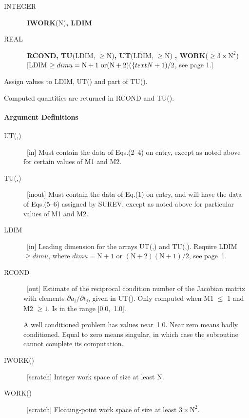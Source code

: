 \documentclass[twoside]{MATH77}
\begin{document}
\begin{description}
\item[INTEGER]  \ {\bf IWORK}(N){\bf , LDIM}

\item[REAL]  \ {\bf RCOND, TU}(LDIM, $\geq $N){\bf , UT}(LDIM, $\geq $N){\bf %
, WORK}($\geq 3\times \text{N}^2$) \ [LDIM $\geq dimu = \text{N}+1 \text{ or}\\
(\text{N}+2)(\{text{N}+1)/2$, see page 1.]
\end{description}

Assign values to LDIM, UT() and part of TU().

\begin{center}
\end{center}

Computed quantities are returned in RCOND and TU().

\paragraph{Argument Definitions}

\begin{description}
\item[UT(,)]  \ [in] Must contain the data of Eqs.(2--4) on entry, except as
noted above for certain values of M1 and M2.

\item[TU(,)]  \ [inout] Must contain the data of Eq.(1) on entry, and will
have the data of Eqs.(5--6) assigned by SUREV, except as noted above for
particular values of M1 and M2.

\item[LDIM]  \ [in] Leading dimension for the arrays UT(,) and TU(,).
Require LDIM $\geq dimu$, where $dimu  = \text{N}+1 \text{ or }
(\text{N}+2)(\text{N}+1)/2$, see
page~1.

\item[RCOND]  \ [out] Estimate of the reciprocal condition number of the
Jacobian matrix with elements $\partial u_i/\partial t_j$, given in UT().
Only computed when M1 $\leq $ 1 and M2 $\geq 1$. Is in the range [0.0,~1.0].

A well conditioned problem has values near~1.0. Near zero means badly
conditioned. Equal to zero means singular, in which case the subroutine
cannot complete its computation.

\item[IWORK()]  \ [scratch] Integer work space of size at least N.

\item[WORK()]  \ [scratch] Floating-point work space of size at least $%
3\times \text{N}^2.$
\end{description}
\end{document}
